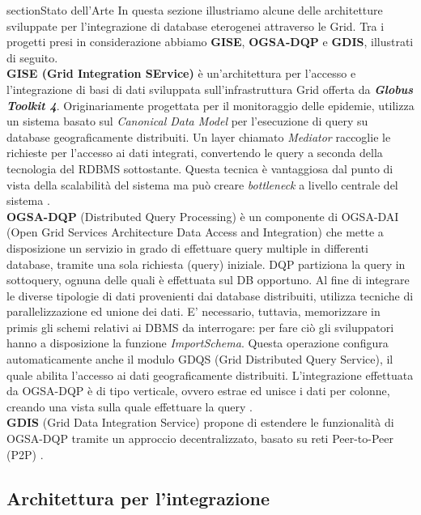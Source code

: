 \documentclass[11pt]{article}
\begin{document}
section{Stato dell'Arte}
In questa sezione illustriamo alcune delle architetture sviluppate per l'integrazione di database eterogenei attraverso le Grid. Tra i progetti presi in considerazione abbiamo \textbf{GISE}, \textbf{OGSA-DQP} e \textbf{GDIS}, illustrati di seguito. \\

\textbf{GISE (Grid Integration SErvice)} è un'architettura per l'accesso e l'integrazione di basi di dati sviluppata sull'infrastruttura Grid offerta da \textbf{\emph{Globus Toolkit 4}}. Originariamente progettata per il monitoraggio delle epidemie, utilizza un sistema basato sul \emph{Canonical Data Model} per l'esecuzione di query su database geograficamente distribuiti. Un layer chiamato \emph{Mediator} raccoglie le richieste per l'accesso ai dati integrati, convertendo le query a seconda della tecnologia del RDBMS sottostante. Questa tecnica è vantaggiosa dal punto di vista della scalabilità del sistema ma può creare \emph{bottleneck} a livello centrale del sistema \cite{archgrid}. \\

\textbf{OGSA-DQP} (Distributed Query Processing) è un componente di OGSA-DAI (Open Grid Services Architecture Data Access and Integration) che mette a disposizione un servizio in grado di effettuare query multiple in differenti database, tramite una sola richiesta (query) iniziale. DQP partiziona la query in sottoquery, ognuna delle quali è effettuata sul DB opportuno. Al fine di integrare le diverse tipologie di dati provenienti dai database distribuiti, utilizza tecniche di parallelizzazione ed unione dei dati. E' necessario, tuttavia, memorizzare in primis gli schemi relativi ai DBMS da interrogare: per fare ciò gli sviluppatori hanno a disposizione la funzione \emph{ImportSchema}. Questa operazione configura automaticamente anche il modulo GDQS (Grid Distributed Query Service), il quale abilita l'accesso ai dati geograficamente distribuiti. L'integrazione effettuata da OGSA-DQP è di tipo verticale, ovvero estrae ed unisce i dati per colonne, creando una vista sulla quale effettuare la query \cite{archgrid}.\\

\textbf{GDIS} (Grid Data Integration Service) propone di estendere le funzionalità di OGSA-DQP tramite un approccio decentralizzato, basato su reti Peer-to-Peer (P2P) \cite{comito2004gdis}.

\subsection{Architettura per l'integrazione}
\end{document}
